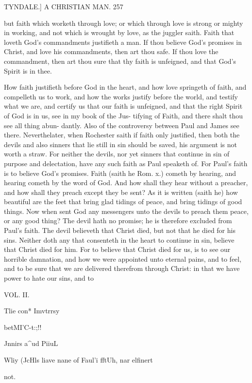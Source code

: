 \documentclass{custom}
\begin{document}
{{TYNDALE.]
A CHRISTIAN MAN. 
257

but faith which worketh through love; or which through 
love is strong or mighty in working, and not which is 
wrought by love, as the juggler saith. Faith that loveth 
God's commandments justifieth a man. If thou believe 
God's promises in Christ, and love his commandments, 
then art thou safe. If thou love the commandment, then 
art thou sure that thy faith is unfeigned, and that God's 
Spirit is in thee. 

How faith justifieth before God in the heart, and how 
love springeth of faith, and compelleth us to work, and 
how the works justify before the world, and testify what 
we are, and certify us that our faith is unfeigned, and that 
the right Spirit of God is in us, see in my book of the Jus- 
tifying of Faith, and there shalt thou see all thing abun- 
dantly. Also of the controversy between Paul and 
James see there. Neverthelater, when Rochester saith 
if faith only justified, then both the devils and also 
sinners that lie still in sin should be saved, his argument is 
not worth a straw. For neither the devils, nor yet sinners 
that continue in sin of purpose and delectation, have any 
such faith as Paul speaketh of. For Paul's faith is to 
believe God's promises. Faith (saith he Rom. x.) cometh 
by hearing, and hearing cometh by the word of God. 
And how shall they hear without a preacher, and how shall 
they preach except they be sent? As it is written (saith 
he) how beautiful are the feet that bring glad tidings of 
peace, and bring tidings of good things. Now when 
sent God any messengers unto the devils to preach them 
peace, or any good thing? The devil hath no promise; 
he is therefore excluded from Paul's faith. The devil 
believeth that Christ died, but not that he died for his sins. 
Neither doth any that consenteth in the heart to continue 
in sin, believe that Christ died for him. For to believe 
that Christ died for us, is to see our horrible damnation, 
and how we were appointed unto eternal pains, and to feel, 
and to be sure that we are delivered therefrom through 
Christ: in that we have power to hate our sins, and to 

VOL. II.

Tlie con* 
Imvtrrsy 

betMI'C-t:;!! 

Jnnirs a^ud 
PiiuL 

Wliy (JcHls 
liave nane 
of Faul'i 
fftUh, nar 
elfinert 

not. 

}}
\end{document}
